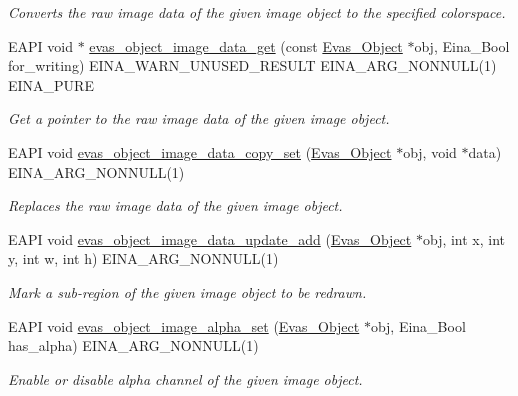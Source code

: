 \begin{DoxyCompactItemize}
\begin{DoxyCompactList}\small\item\em Converts the raw image data of the given image object to the specified colorspace. \item\end{DoxyCompactList}\item 
EAPI void $\ast$ \hyperlink{group__Evas__Object__Image_gabe5883e22418071463f4ae97ca8885b2}{evas\_\-object\_\-image\_\-data\_\-get} (const \hyperlink{group__Evas__Object__Group_ga9e19e6dd1f517a0ba437c0114d3e7c97}{Evas\_\-Object} $\ast$obj, Eina\_\-Bool for\_\-writing) EINA\_\-WARN\_\-UNUSED\_\-RESULT EINA\_\-ARG\_\-NONNULL(1) EINA\_\-PURE
\begin{DoxyCompactList}\small\item\em Get a pointer to the raw image data of the given image object. \item\end{DoxyCompactList}\item 
EAPI void \hyperlink{group__Evas__Object__Image_ga97d17b8d95f0ca01a264a6c303d00c27}{evas\_\-object\_\-image\_\-data\_\-copy\_\-set} (\hyperlink{group__Evas__Object__Group_ga9e19e6dd1f517a0ba437c0114d3e7c97}{Evas\_\-Object} $\ast$obj, void $\ast$data) EINA\_\-ARG\_\-NONNULL(1)
\begin{DoxyCompactList}\small\item\em Replaces the raw image data of the given image object. \item\end{DoxyCompactList}\item 
EAPI void \hyperlink{group__Evas__Object__Image_gab6b763271781a2ab35f5849f6564e165}{evas\_\-object\_\-image\_\-data\_\-update\_\-add} (\hyperlink{group__Evas__Object__Group_ga9e19e6dd1f517a0ba437c0114d3e7c97}{Evas\_\-Object} $\ast$obj, int x, int y, int w, int h) EINA\_\-ARG\_\-NONNULL(1)
\begin{DoxyCompactList}\small\item\em Mark a sub-\/region of the given image object to be redrawn. \item\end{DoxyCompactList}\item 
EAPI void \hyperlink{group__Evas__Object__Image_gadf2df4027a211db3f9a1fb21f248d7fb}{evas\_\-object\_\-image\_\-alpha\_\-set} (\hyperlink{group__Evas__Object__Group_ga9e19e6dd1f517a0ba437c0114d3e7c97}{Evas\_\-Object} $\ast$obj, Eina\_\-Bool has\_\-alpha) EINA\_\-ARG\_\-NONNULL(1)
\begin{DoxyCompactList}\small\item\em Enable or disable alpha channel of the given image object. \item\end{DoxyCompactList}\item 

\end{DoxyCompactItemize}
